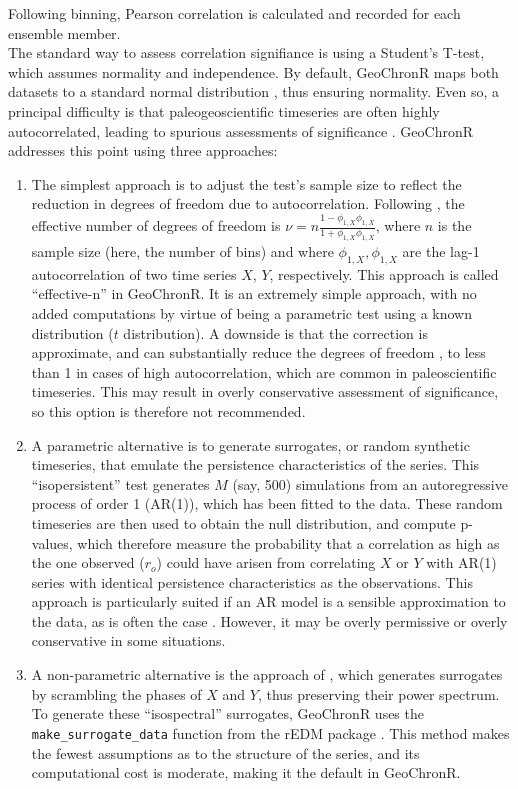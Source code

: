 \documentclass[gchron, manuscript]{copernicus}
\begin{document}
Following binning, Pearson correlation is calculated and recorded for each ensemble member.\\
The standard way to assess correlation signifiance is using a Student's T-test, which assumes normality and independence.
By default, GeoChronR maps both datasets to a standard normal distribution \citep[\citet{vanAlbada2007}]{JEG_Tingley_CP2016}, thus ensuring normality. Even so, a principal difficulty is that paleogeoscientific timeseries are often highly autocorrelated, leading to spurious assessments of significance \citep{Hu_epsl17}. GeoChronR addresses this point using three approaches:

\begin{enumerate}
\def\labelenumi{\arabic{enumi}.}
\item
  The simplest approach is to adjust the test's sample size to reflect the reduction in degrees of freedom due to autocorrelation. Following \citet{dawdy1964statistical}, the effective number of degrees of freedom is \(\nu = n \frac{1-\phi_{1,X}\phi_{1,X}}{1+\phi_{1,X}\phi_{1,X}}\), where \(n\) is the sample size (here, the number of bins) and where \(\phi_{1,X}, \phi_{1,X}\) are the lag-1 autocorrelation of two
  time series \(X\), \(Y\), respectively. This approach is called ``effective-n'' in GeoChronR. It is an extremely simple approach, with no added computations by virtue of being a parametric test using a known distribution (\(t\) distribution).
  A downside is that the correction is approximate, and can substantially reduce the degrees of freedom \citep{Hu_epsl17}, to less than 1 in cases of high autocorrelation, which are common in paleoscientific timeseries.
  This may result in overly conservative assessment of significance, so this option is therefore not recommended.
\item
  A parametric alternative is to generate surrogates, or random synthetic timeseries, that emulate the persistence characteristics of the series.
  This ``isopersistent'' test generates \(M\) (say, 500) simulations from an autoregressive process of order 1 (AR(1)), which has been fitted to the data.
  These random timeseries are then used to obtain the null distribution, and compute p-values, which therefore measure the probability that a correlation as high as the one observed (\(r_o\)) could have arisen from correlating \(X\) or \(Y\) with AR(1) series with identical persistence characteristics as the observations.
  This approach is particularly suited if an AR model is a sensible approximation to the data, as is often the case \citep{Ghil02}.
  However, it may be overly permissive or overly conservative in some situations.
\item
  A non-parametric alternative is the approach of \citet{Ebisuzaki_JClim97}, which generates surrogates by scrambling the phases of \(X\) and \(Y\), thus preserving their power spectrum.
  To generate these ``isospectral'' surrogates, GeoChronR uses the \texttt{make\_surrogate\_data} function from the rEDM package \citep{rEDM}.
  This method makes the fewest assumptions as to the structure of the series, and its computational cost is moderate, making it the default in GeoChronR.
\end{enumerate}
\end{document}
